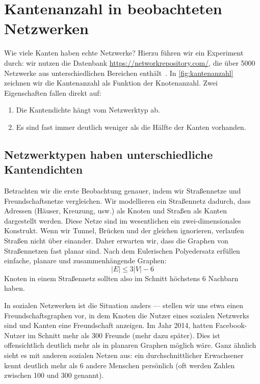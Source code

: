 \section{Kantenanzahl in beobachteten Netzwerken}\label{sec:kanten-in-beobachteten-netzen}
Wie viele Kanten haben echte Netzwerke? Hierzu führen wir ein Experiment durch:
wir nutzen die Datenbank \url{https://networkrepository.com/}, die über 5000 Netzwerke aus unterschiedlichen Bereichen enthält~\cite{networkrepository}.
In \cref{fig:kantenanzahl} zeichnen wir die Kantenanzahl als Funktion der Knotenanzahl.
Zwei Eigenschaften fallen direkt auf:
\begin{enumerate}
    \item Die Kantendichte hängt vom Netzwerktyp ab.
    \item Es sind fast immer deutlich weniger als die Hälfte der Kanten vorhanden.
\end{enumerate}

\subsection{Netzwerktypen haben unterschiedliche Kantendichten}
Betrachten wir die erste Beobachtung genauer, indem wir Straßennetze und Freundschaftsnetze vergleichen.
Wir modellieren ein Straßennetz dadurch, dass Adressen (Häuser, Kreuzung, usw.) als Knoten und Straßen als Kanten dargestellt werden.
Diese Netze  sind im wesentlichen ein zwei-dimensionales Konstrukt.
Wenn wir Tunnel, Brücken und der gleichen ignorieren, verlaufen Straßen nicht über einander.
Daher erwarten wir, dass die Graphen von Straßennetzen fast planar sind.
Nach dem Eulerischen Polyedersatz erfüllen einfache,  planare und zusammenhängende Graphen:
\begin{equation}
    |E| \le 3 |V| - 6
\end{equation}
Knoten in einem Straßennetz sollten also im Schnitt höchstens 6 Nachbarn haben.

In  sozialen Netzwerken ist die Situation anders ---
stellen wir uns etwa einen Freundschaftsgraphen vor, in dem Knoten die Nutzer eines sozialen Netzwerks sind und Kanten eine Freundschaft anzeigen.
Im Jahr 2014, hatten Facebook-Nutzer im Schnitt mehr als 300 Freunde (mehr dazu später).
Dies ist offensichtlich deutlich mehr als in planaren Graphen möglich wäre.
Ganz ähnlich sieht es mit anderen sozialen Netzen aus: ein durchschnittlicher Erwachsener kennt deutlich mehr als 6 andere Menschen persönlich (oft werden Zahlen zwischen 100 und 300 genannt).

